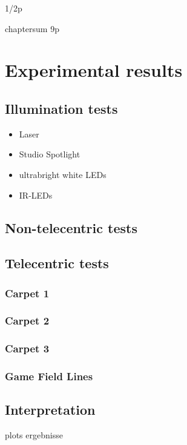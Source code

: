 \documentclass[12pt,a4paper]{article}
\begin{document}
1/2p


chaptersum 9p

\section{Experimental results}

\subsection{Illumination tests}

\begin{itemize}
  \item Laser
  \item Studio Spotlight
  \item ultrabright white LEDs
  \item IR-LEDs
\end{itemize}

\subsection{Non-telecentric tests}

\subsection{Telecentric tests}

\subsubsection{Carpet 1}

\subsubsection{Carpet 2}

\subsubsection{Carpet 3}

\subsubsection{Game Field Lines}

\subsection{Interpretation}

  plots
  ergebnisse
\end{document}
